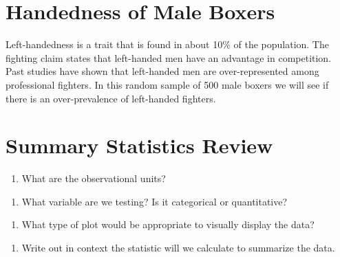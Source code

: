 \documentclass[
]{report}
\providecommand{\tightlist}{%
  \setlength{\itemsep}{0pt}\setlength{\parskip}{0pt}}
\begin{document}
\hypertarget{handedness-of-male-boxers}{%
\section{Handedness of Male Boxers}\label{handedness-of-male-boxers}}

Left-handedness is a trait that is found in about 10\% of the population. The fighting claim states that left-handed men have an advantage in competition. Past studies have shown that left-handed men are over-represented among professional fighters. In this random sample of 500 male boxers we will see if there is an over-prevalence of left-handed fighters.

\hypertarget{summary-statistics-review}{%
\section{Summary Statistics Review}\label{summary-statistics-review}}

\begin{enumerate}
\def\labelenumi{\arabic{enumi}.}
\tightlist
\item
  What are the observational units?
\end{enumerate}

\vspace{0.5in}

\begin{enumerate}
\def\labelenumi{\arabic{enumi}.}
\setcounter{enumi}{1}
\tightlist
\item
  What variable are we testing? Is it categorical or quantitative?
\end{enumerate}

\vspace{1in}

\begin{enumerate}
\def\labelenumi{\arabic{enumi}.}
\setcounter{enumi}{2}
\tightlist
\item
  What type of plot would be appropriate to visually display the data?
\end{enumerate}

\vspace{1in}

\begin{enumerate}
\def\labelenumi{\arabic{enumi}.}
\setcounter{enumi}{3}
\tightlist
\item
  Write out in context the statistic will we calculate to summarize the data.
\end{enumerate}
\end{document}
